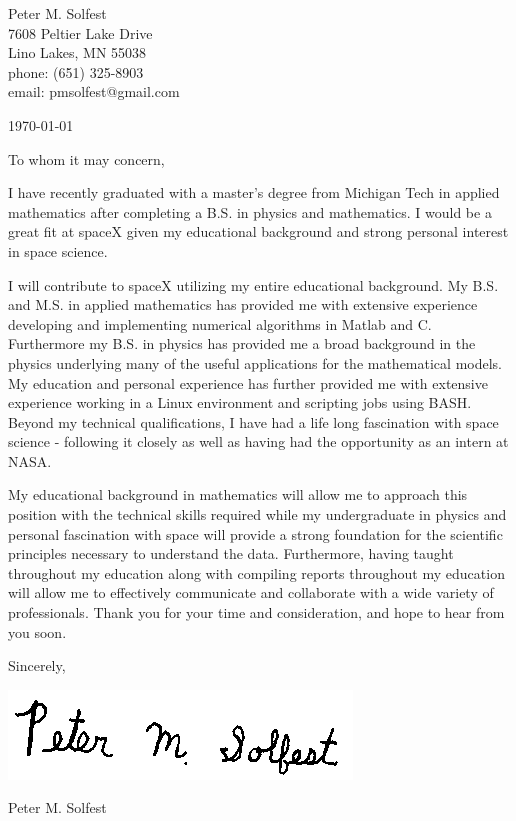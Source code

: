 \documentclass[letterpaper,12pt]{article}
\begin{document}
Peter M. Solfest\\
7608 Peltier Lake Drive\\
Lino Lakes, MN 55038\\
phone: (651) 325-8903\\
email: pmsolfest@gmail.com

\today


To whom it may concern, %

I have recently graduated with a master's degree from Michigan Tech in applied mathematics after
completing a B.S. in physics and mathematics.
I would be a great fit at spaceX given my educational background
and strong personal interest in space science.

I will contribute to spaceX utilizing my entire educational background.
My B.S. and M.S. in applied mathematics has provided me with extensive experience developing
and implementing numerical algorithms in Matlab and C.
Furthermore my B.S. in physics has provided me a broad background in the physics
underlying many of the useful applications for the mathematical models.
My education and personal experience has further provided me with
extensive experience working in a Linux environment and scripting
jobs using BASH.
Beyond my technical qualifications, I have had a life long fascination with
space science - following it closely as well as having had the opportunity
as an intern at NASA.

My educational background in mathematics will allow 
me to approach this position with the technical skills required
while my undergraduate in physics and personal fascination with space
will provide a strong foundation for the scientific principles necessary
to understand the data.
Furthermore, having taught throughout my education along with compiling reports
throughout my education will allow me to effectively communicate and
collaborate with a wide variety of professionals.
Thank you for your time and consideration, and hope to hear from you soon.

Sincerely,

\includegraphics[height=.5in]{signature.png}

Peter M. Solfest
\end{document}
